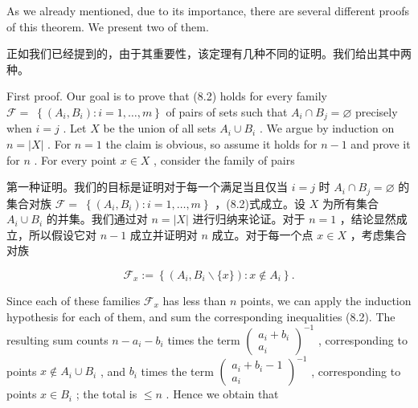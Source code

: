 \documentclass[10pt]{article}
\begin{document}
As we already mentioned, due to its importance, there are several different proofs of this theorem. We present two of them.

\begin{tcolorbox}\relax
正如我们已经提到的，由于其重要性，该定理有几种不同的证明。我们给出其中两种。
\end{tcolorbox}

First proof. Our goal is to prove that (8.2) holds for every family \(\mathcal{F} = \; \left\{  {\left( {{A}_{i},{B}_{i}}\right)  : i = 1,\ldots ,m}\right\}\) of pairs of sets such that \({A}_{i} \cap  {B}_{j} = \varnothing\) precisely when \(i = j\) . Let \(X\) be the union of all sets \({A}_{i} \cup  {B}_{i}\) . We argue by induction on \(n = \left| X\right|\) . For \(n = 1\) the claim is obvious, so assume it holds for \(n - 1\) and prove it for \(n\) . For every point \(x \in  X\) , consider the family of pairs

\begin{tcolorbox}\relax
第一种证明。我们的目标是证明对于每一个满足当且仅当 \(i = j\) 时 \({A}_{i} \cap  {B}_{j} = \varnothing\) 的集合对族 \(\mathcal{F} = \; \left\{  {\left( {{A}_{i},{B}_{i}}\right)  : i = 1,\ldots ,m}\right\}\) ，(8.2)式成立。设 \(X\) 为所有集合 \({A}_{i} \cup  {B}_{i}\) 的并集。我们通过对 \(n = \left| X\right|\) 进行归纳来论证。对于 \(n = 1\) ，结论显然成立，所以假设它对 \(n - 1\) 成立并证明对 \(n\) 成立。对于每一个点 \(x \in  X\) ，考虑集合对族
\end{tcolorbox}

\[
{\mathcal{F}}_{x} \mathrel{\text{ := }} \left\{  {\left( {{A}_{i},{B}_{i}\smallsetminus \{ x\} }\right)  : x \notin  {A}_{i}}\right\}  .
\]

Since each of these families \({\mathcal{F}}_{x}\) has less than \(n\) points, we can apply the induction hypothesis for each of them, and sum the corresponding inequalities (8.2). The resulting sum counts \(n - {a}_{i} - {b}_{i}\) times the term \({\left( \begin{matrix} {a}_{i} + {b}_{i} \\  {a}_{i} \end{matrix}\right) }^{-1}\) , corresponding to points \(x \notin  {A}_{i} \cup  {B}_{i}\) , and \({b}_{i}\) times the term \({\left( \begin{matrix} {a}_{i} + {b}_{i} - 1 \\  {a}_{i} \end{matrix}\right) }^{-1}\) , corresponding to points \(x \in  {B}_{i}\) ; the total is \(\leq  n\) . Hence we obtain that
\end{document}
